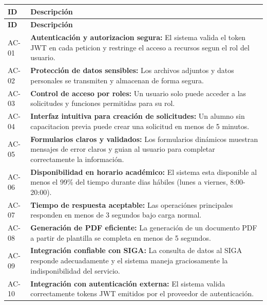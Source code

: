 \begin{longtable}{|C{1.2cm}|L{12.5cm}|}
    \hline
    \textbf{ID} & \textbf{Descripción} \\
    \hline
    \endfirsthead
    \hline
    \textbf{ID} & \textbf{Descripción} \\
    \hline
    \endhead
    \hline
    \endfoot

    AC-01 & \textbf{Autenticación y autorizacion segura:} El sistema valida el token JWT en cada peticion y restringe el acceso a recursos segun el rol del usuario. \\
    \hline
    AC-02 & \textbf{Protección de datos sensibles:} Los archivos adjuntos y datos personales se transmiten y almacenan de forma segura. \\
    \hline
    AC-03 & \textbf{Control de acceso por roles:} Un usuario solo puede acceder a las solicitudes y funciones permitidas para su rol. \\
    \hline
    AC-04 & \textbf{Interfaz intuitiva para creación de solicitudes:} Un alumno sin capacitacion previa puede crear una solicitud en menos de 5 minutos. \\
    \hline
    AC-05 & \textbf{Formularios claros y validados:} Los formularios dinámicos muestran mensajes de error claros y guian al usuario para completar correctamente la información. \\
    \hline
    AC-06 & \textbf{Disponibilidad en horario académico:} El sistema esta disponible al menos el 99\% del tiempo durante dias hábiles (lunes a viernes, 8:00-20:00). \\
    \hline
    AC-07 & \textbf{Tiempo de respuesta aceptable:} Las operaciónes principales responden en menos de 3 segundos bajo carga normal. \\
    \hline
    AC-08 & \textbf{Generación de PDF eficiente:} La generación de un documento PDF a partir de plantilla se completa en menos de 5 segundos. \\
    \hline
    AC-09 & \textbf{Integración confiable con SIGA:} La consulta de datos al SIGA responde adecuadamente y el sistema maneja graciosamente la indisponibilidad del servicio. \\
    \hline
    AC-10 & \textbf{Integración con autenticación externa:} El sistema valida correctamente tokens JWT emitidos por el proveedor de autenticación. \\
    \hline
\end{longtable}

